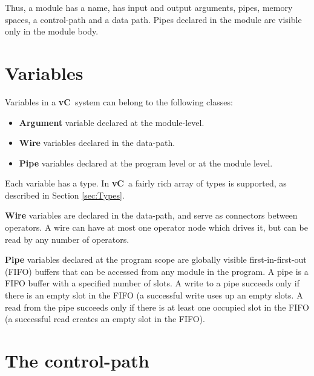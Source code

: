 \documentclass{article}
\newcommand{\vC}{{\bf vC}~}
\begin{document}
Thus, a module has a name, has input and output arguments,
pipes, memory spaces, a control-path and a data path.
Pipes declared in the module are visible only in the
module body.   

\section{Variables} \label{sec:Objects}

Variables in  a \vC system can belong to the following classes:
\begin{itemize}
\item {\bf Argument} variable declared at the module-level.
\item {\bf Wire} variables declared in the data-path.
\item {\bf Pipe} variables declared at the program level or at the module level.
\end{itemize}

Each variable has a type.  In \vC a fairly rich array of
types is supported, as described in Section \ref{sec:Types}.

{\bf Wire} variables are declared in the data-path, and
serve as connectors between operators.  A wire can have
at most one operator node which drives it, but can
be read by any number of operators.

{\bf Pipe} variables declared at the program scope
are globally visible first-in-first-out (FIFO) buffers that can 
be accessed from any module in the program.  A pipe
is a FIFO buffer with a specified number of
slots.  A write to a pipe succeeds
only if there is an empty slot in the FIFO (a successful
write uses up an empty slots.  A read
from the pipe succeeds only if there is at
least one occupied slot in the FIFO (a successful read
creates an empty slot in the FIFO). 


\section{The control-path} \label{sec:Controlpath}
 
\end{document}
